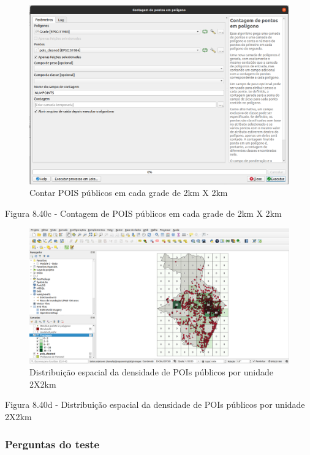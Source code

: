 \documentclass[
]{book}
\begin{document}
\begin{figure}
\centering
\includegraphics{media/modulo8/fig840_c.png}
\caption{Contar POIS públicos em cada grade de 2km X 2km}
\end{figure}

Figura 8.40c - Contagem de POIS públicos em cada grade de 2km X 2km

\begin{figure}
\centering
\includegraphics{media/modulo8/fig840_d.png}
\caption{Distribuição espacial da densidade de POIs públicos por unidade 2X2km}
\end{figure}

Figura 8.40d - Distribuição espacial da densidade de POIs públicos por unidade 2X2km

\hypertarget{perguntas-do-teste-1}{%
\subsubsection{\texorpdfstring{\textbf{Perguntas do teste}}{Perguntas do teste}}\label{perguntas-do-teste-1}}
\end{document}
